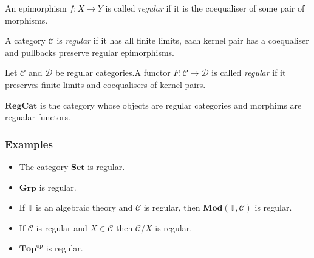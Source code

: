 \documentclass[14pt]{beamer}
\theoremstyle{plain}
\begin{document}
  \begin{frame}[fragile]
    \begin{definition}
      An epimorphism $f : X \to Y$ is called \emph{regular} if it is the coequaliser
      of some pair of morphisms.
      \begin{center}
      \end{center}
    \end{definition}
    \pause
    \begin{definition}
      A category $\mathcal{C}$ is \emph{regular} if it has all finite limits,
      each kernel pair has a coequaliser and pullbacks preserve regular epimorphisms.
    \end{definition}
  \end{frame}

  \begin{frame}
    \begin{definition}
      Let $\mathcal{C}$ and $\mathcal{D}$ be regular categories.A functor
      $F : \mathcal{C} \to \mathcal{D}$ is called \emph{regular} if it preserves finite
      limits and coequalisers of kernel pairs.
    \end{definition}
    \pause
    \begin{definition}
      $\mathbf{RegCat}$ is the category whose objects are regular categories and
      morphims are regualar functors.
    \end{definition}
  \end{frame}

  \begin{frame}
    \frametitle{Examples}
    \begin{itemize}
      \item<1-> The category $\mathbf{Set}$ is regular.
      \item<2-> $\mathbf{Grp}$ is regular.
      \item<3-> If $\mathbb{T}$ is an algebraic theory and $\mathcal{C}$ is regular,
        then $\mathbf{Mod}(\mathbb{T}, \mathcal{C})$ is regular.
      \item<4-> If $\mathcal{C}$ is regular and $X \in \mathcal{C}$ then $\mathcal{C}/X$
        is regular.
      \item<5-> $\mathbf{Top}^{\mathrm{op}}$ is regular.
    \end{itemize}
  \end{frame}
\end{document}
